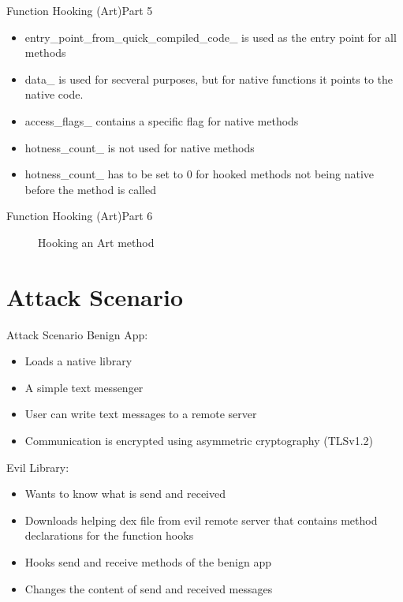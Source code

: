 \begin{frame}{Function Hooking (Art)}{Part 5}
    \begin{itemize}
    \item  entry\_point\_from\_quick\_compiled\_code\_ is used as the entry point for all methods
    \item data\_ is used for secveral purposes, but for native functions it points to the native code.
    \item access\_flags\_ contains a specific flag for native methods
    \item hotness\_count\_ is not used for native methods 
    \item hotness\_count\_ has to be set to 0 for hooked methods not being native before the method is called
    \end{itemize}
\end{frame}


\begin{frame}[fragile]{Function Hooking (Art)}{Part 6}

\begin{figure}[H]
	\begin{center}
	\hspace*{-1cm}
	\end{center}
	\caption{Hooking an Art method}
	\label{HookEndResult}
\end{figure}


\end{frame}

\section{Attack Scenario}
\begin{frame}{Attack Scenario}
Benign App:
    \begin{itemize}
    \item Loads a native library
    \item A simple text messenger 
    \item User can write text messages to a remote server
    \item Communication is encrypted using asymmetric cryptography (TLSv1.2) 
    \end{itemize}
Evil Library:
    \begin{itemize}
    \item Wants to know what is send and received
    \item Downloads helping dex file from evil remote server that contains method declarations for the function hooks
    \item Hooks send and receive methods of the benign app
    \item Changes the content of send and received messages 
    \end{itemize}    
\end{frame}

